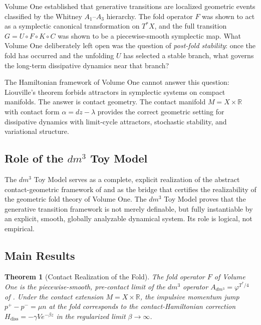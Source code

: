 \documentclass[11pt]{article}
\theoremstyle{boxed}
\newtheorem{theorem}{Theorem}[section]
\begin{document}
Volume One established that generative transitions are localized geometric events
classified by the Whitney $A_1$--$A_3$ hierarchy. The fold operator $F$ was shown
to act as a symplectic canonical transformation on $T^{*}X$, and the full transition
$G = U \circ F \circ K \circ C$ was shown to be a piecewise-smooth symplectic map.
What Volume One deliberately left open was the question of \emph{post-fold stability}:
once the fold has occurred and the unfolding $U$ has selected a stable branch, what
governs the long-term dissipative dynamics near that branch?

The Hamiltonian framework of Volume One cannot answer this question: Liouville's
theorem forbids attractors in symplectic systems on compact manifolds. The answer
is contact geometry. The contact manifold $M = X \times \mathbb{R}$ with contact
form $\alpha = dz - \lambda$ provides the correct geometric setting for dissipative
dynamics with limit-cycle attractors, stochastic stability, and variational structure.

\subsection{Role of the $dm^3$ Toy Model}

The $dm^3$ Toy Model \cite{dm3} serves as a complete, explicit realization of the
abstract contact-geometric framework of \cite{GCM} and as the bridge that certifies
the realizability of the geometric fold theory of Volume One. The $dm^3$ Toy Model
proves that the generative transition framework is not merely definable, but fully
instantiable by an explicit, smooth, globally analyzable dynamical system. Its role
is logical, not empirical.

\subsection{Main Results}

\begin{theorem}[Contact Realization of the Fold]\label{thm:A}
The fold operator $F$ of Volume One is the piecewise-smooth, pre-contact limit of
the $dm^3$ operator $A_{dm^3} = \varphi^{T^{*}/4}$ of \cite{GCM}. Under the contact
extension $M = X \times \mathbb{R}$, the impulsive momentum jump
$p^{+} - p^{-} = \mu n$ at the fold corresponds to the contact-Hamiltonian
correction $H_{\mathrm{diss}} = -\gamma V e^{-\beta z}$ in the regularized limit
$\beta \to \infty$.
\end{theorem}
\end{document}
